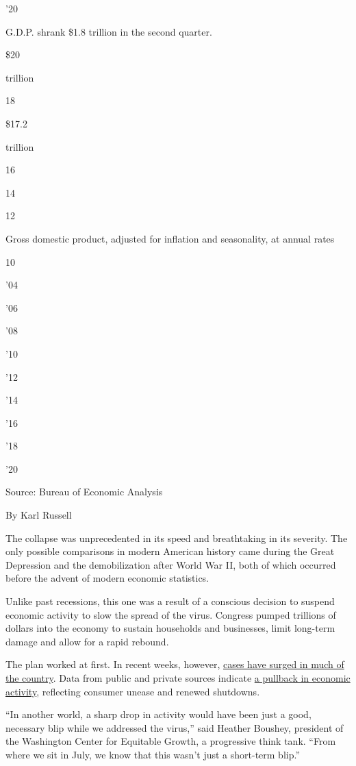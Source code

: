 '20

G.D.P. shrank \$1.8 trillion in the second quarter.

\$20

trillion

18

\$17.2

trillion

16

14

12

Gross domestic product, adjusted for inflation and seasonality, at
annual rates

10

'04

'06

'08

'10

'12

'14

'16

'18

'20

Source: Bureau of Economic Analysis

By Karl Russell

The collapse was unprecedented in its speed and breathtaking in its
severity. The only possible comparisons in modern American history came
during the Great Depression and the demobilization after World War II,
both of which occurred before the advent of modern economic statistics.

Unlike past recessions, this one was a result of a conscious decision to
suspend economic activity to slow the spread of the virus. Congress
pumped trillions of dollars into the economy to sustain households and
businesses, limit long-term damage and allow for a rapid rebound.

The plan worked at first. In recent weeks, however,
\href{https://www.nytimes.com/2020/07/29/health/coronavirus-future-america.html}{cases
have surged in much of the country}. Data from public and private
sources indicate
\href{https://www.nytimes.com/2020/07/15/business/economy/economic-recovery-coronavirus-resurgence.html?action=click\&module=RelatedLinks\&pgtype=Article}{a
pullback in economic activity}, reflecting consumer unease and renewed
shutdowns.

``In another world, a sharp drop in activity would have been just a
good, necessary blip while we addressed the virus,'' said Heather
Boushey, president of the Washington Center for Equitable Growth, a
progressive think tank. ``From where we sit in July, we know that this
wasn't just a short-term blip.''

